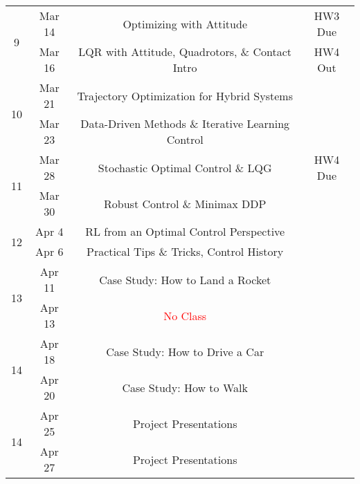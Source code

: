 \documentclass[11pt,letterpaper]{article}
\begin{document}
\begin{tabular}{c|c|c|c}
	\hline
	\multirow{2}{*}{9}  & Mar 14 & Optimizing with Attitude & HW3 Due \\
	 & Mar 16 & LQR with Attitude, Quadrotors, \& Contact Intro & HW4 Out \\
	\hline
	\multirow{2}{*}{10}  & Mar 21 & Trajectory Optimization for Hybrid Systems &  \\
	 & Mar 23 & Data-Driven Methods \& Iterative Learning Control &   \\
	 \hline
	\multirow{2}{*}{11}  & Mar 28 & Stochastic Optimal Control \& LQG & HW4 Due \\
	 & Mar 30 & Robust Control \& Minimax DDP &   \\
	 \hline
	\multirow{2}{*}{12}  & Apr 4 & RL from an Optimal Control Perspective &   \\
	 & Apr 6 & Practical Tips \& Tricks, Control History &   \\
	 \hline
	\multirow{2}{*}{13}  & Apr 11 & Case Study: How to Land a Rocket &  \\
	 & Apr 13 & \textcolor{red}{No Class} &   \\
	 \hline
	\multirow{2}{*}{14}  & Apr 18 & Case Study: How to Drive a Car &  \\
	 & Apr 20 & Case Study: How to Walk &   \\
	 \hline
	\multirow{2}{*}{14}  & Apr 25 & Project Presentations &  \\
	 & Apr 27 & Project Presentations &   \\
\end{tabular}
\end{document}
